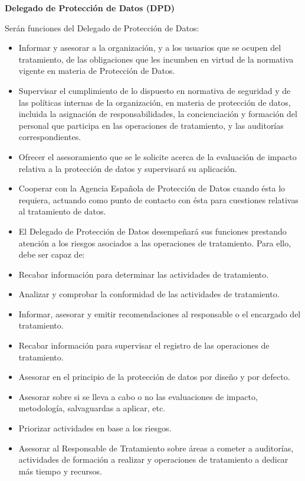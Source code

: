 \begin{enumerate}[label=\alph*)]
\textbf{Delegado de Protecci\'on de Datos (DPD)}

Ser\'an funciones del Delegado de Protecci\'on de Datos:

\begin{itemize}
    \item Informar y asesorar a la organizaci\'on, y a los usuarios que se ocupen del tratamiento, de las obligaciones que les incumben en virtud de la normativa vigente en materia de Protecci\'on de Datos.
    \item Supervisar el cumplimiento de lo dispuesto en normativa de seguridad y de las pol\'iticas internas de la organizaci\'on, en materia de protecci\'on de datos, incluida la asignaci\'on de responsabilidades, la concienciaci\'on y formaci\'on del personal que participa en las operaciones de tratamiento, y las auditor\'ias correspondientes.
    \item Ofrecer el asesoramiento que se le solicite acerca de la evaluaci\'on de impacto relativa a la protecci\'on de datos y supervisar\'a su aplicaci\'on.
    \item Cooperar con la Agencia Espa\~nola de Protecci\'on de Datos cuando \'esta lo requiera, actuando como punto de contacto con \'esta para cuestiones relativas al tratamiento de datos.
    \item El Delegado de Protecci\'on de Datos desempe\~nar\'a sus funciones prestando atenci\'on a los riesgos asociados a las operaciones de tratamiento. Para ello, debe ser capaz de:
    \item Recabar informaci\'on para determinar las actividades de tratamiento.
    \item Analizar y comprobar la conformidad de las actividades de tratamiento.
    \item Informar, asesorar y emitir recomendaciones al responsable o el encargado del tratamiento.
    \item Recabar informaci\'on para supervisar el registro de las operaciones de tratamiento.
    \item Asesorar en el principio de la protecci\'on de datos por dise\~no y por defecto.
    \item Asesorar sobre si se lleva a cabo o no las evaluaciones de impacto, metodolog\'ia, salvaguardas a aplicar, etc.
    \item Priorizar actividades en base a los riesgos.
    \item Asesorar al Responsable de Tratamiento sobre \'{a}reas a cometer a auditor\'ias, actividades de formaci\'on a realizar y operaciones de tratamiento a dedicar m\'as tiempo y recursos.
\end{itemize}


\end{enumerate}
